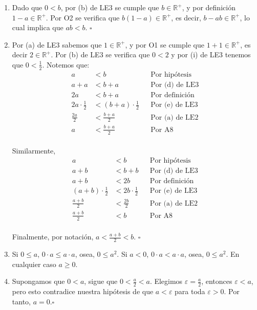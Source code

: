 \documentclass[11pt]{article}
\begin{document}
\begin{enumerate}[label=\alph*),font=\bfseries]

    \item Dado que $0<b$, por (b) de LE3 se cumple que $b \in \mathbb{R}^+$, y por definición $1-a \in \mathbb{R}^+$. Por O2 se verifica que $b(1-a) \in \mathbb{R}^+$, es decir, $b-ab \in \mathbb{R}^+$, lo cual implica que $ab<b$. \mbox{}\hfill $\square$


    \item Por (a) de LE3 sabemos que $1 \in \mathbb{R}^+$, y por O1 se cumple que $1+1 \in \mathbb{R}^+$, es decir $2 \in \mathbb{R}^+$. Por (b) de LE3 se verifica que $0<2$ y por (i) de LE3 tenemos que $0<\frac{1}{2}$. Notemos que: \begin{align*}
        a &< b && \text{Por hipótesis} \\
        a + a &< b+a && \text{Por (d) de LE3} \\
        2a &< b+a && \text{Por definición} \\
        2a \cdot \frac{1}{2} &< (b+a) \cdot \frac{1}{2} && \text{Por (e) de LE3} \\
        \frac{2a}{2} &< \frac{b+a}{2} && \text{Por (a) de LE2} \\
        a &< \frac{b+a}{2} && \text{Por A8}
    \end{align*} \\ Similarmente,
    \begin{align*}
        a &< b && \text{Por hipótesis} \\
        a + b &< b+b && \text{Por (d) de LE3} \\
        a +b &< 2b && \text{Por definición} \\
        (a+b) \cdot \frac{1}{2} &< 2b \cdot \frac{1}{2} && \text{Por (e) de LE3} \\
        \frac{a+b}{2} &< \frac{2b}{2} && \text{Por (a) de LE2} \\
        \frac{a+b}{2} &< b && \text{Por A8}
    \end{align*}\\ Finalmente, por notación, $a < \frac{a+b}{2} < b$. \mbox{}\hfill $\square$


    \item Si $0 \leq a$, $ 0\cdot a \leq a \cdot a$, osea, $0 \leq a^2$. Si $a<0$, $0\cdot a < a \cdot a$, osea, $0 \leq a^2$. En cualquier caso $a\geq0$.

    \item Supongamos que $0<a$, sigue que $0<\frac{a}{2}<a$. Elegimos $\varepsilon=\frac{a}{2}$, entonces $\varepsilon<a$, pero esto contradice nuestra hipótesis de que $a< \varepsilon$ para toda $\varepsilon>0$. Por tanto, $a=0$.\mbox{}\hfill $\square$


\end{enumerate}
\end{document}
